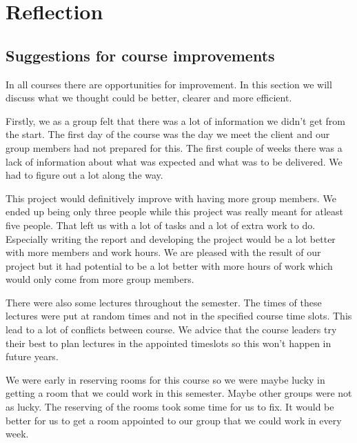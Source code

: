 
\chapter{Reflection}

\section{Suggestions for course improvements}
In all courses there are opportunities for improvement.
In this section we will discuss what we thought could be better, clearer and more efficient.

Firstly, we as a group felt that there was a lot of information we didn't get from the start. 
The first day of the course was the day we meet the client and our group members had not prepared for this.
The first couple of weeks there was a lack of information about what was expected and what was to be delivered.
We had to figure out a lot along the way.

This project would definitively improve with having more group members. 
We ended up being only three people while this project was really meant for atleast five people.
That left us with a lot of tasks and a lot of extra work to do.
Especially writing the report and developing the project would be a lot better with more members and work hours. 
We are pleased with the result of our project but it had potential to be a lot better with more hours of work which would only come from more group members. 

There were also some lectures throughout the semester. 
The times of these lectures were put at random times and not in the specified course time slots.
This lead to a lot of conflicts between course.
We advice that the course leaders try their best to plan lectures in the appointed timeslots so this won't happen in future years. 

We were early in reserving rooms for this course so we were maybe lucky in getting a room that we could work in this semester. 
Maybe other groups were not as lucky. 
The reserving of the rooms took some time for us to fix. 
It would be better for us to get a room appointed to our group that we could work in every week. 




